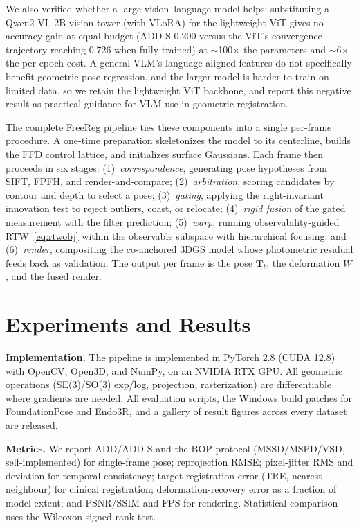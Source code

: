 \documentclass[9pt,twoside,web]{ieeecolor2}
\begin{document}
We also verified whether a large vision--language model helps: substituting a Qwen2-VL-2B vision tower (with VLoRA) for the lightweight ViT gives no accuracy gain at equal budget (ADD-S 0.200 versus the ViT's convergence trajectory reaching 0.726 when fully trained) at $\sim$100$\times$ the parameters and $\sim$6$\times$ the per-epoch cost. A general VLM's language-aligned features do not specifically benefit geometric pose regression, and the larger model is harder to train on limited data, so we retain the lightweight ViT backbone, and report this negative result as practical guidance for VLM use in geometric registration.

The complete FreeReg pipeline ties these components into a single per-frame procedure. A one-time preparation skeletonizes the model to its centerline, builds the FFD control lattice, and initializes surface Gaussians. Each frame then proceeds in six stages: (1)~\emph{correspondence}, generating pose hypotheses from SIFT, FPFH, and render-and-compare; (2)~\emph{arbitration}, scoring candidates by contour and depth to select a pose; (3)~\emph{gating}, applying the right-invariant innovation test to reject outliers, coast, or relocate; (4)~\emph{rigid fusion} of the gated measurement with the filter prediction; (5)~\emph{warp}, running observability-guided RTW~\eqref{eq:rtwobj} within the observable subspace with hierarchical focusing; and (6)~\emph{render}, compositing the co-anchored 3DGS model whose photometric residual feeds back as validation. The output per frame is the pose $\mathbf{T}_{t}$, the deformation $W$, and the fused render.

\section{Experiments and Results}\label{sec:exp}


\textbf{Implementation.} The pipeline is implemented in PyTorch 2.8 (CUDA 12.8) with OpenCV, Open3D, and NumPy, on an NVIDIA RTX GPU. All geometric operations (SE(3)/SO(3) exp/log, projection, rasterization) are differentiable where gradients are needed. All evaluation scripts, the Windows build patches for FoundationPose and Endo3R, and a gallery of result figures across every dataset are released.

\textbf{Metrics.} We report ADD/ADD-S and the BOP protocol (MSSD/MSPD/VSD, self-implemented) for single-frame pose; reprojection RMSE; pixel-jitter RMS and deviation for temporal consistency; target registration error (TRE, nearest-neighbour) for clinical registration; deformation-recovery error as a fraction of model extent; and PSNR/SSIM and FPS for rendering. Statistical comparison uses the Wilcoxon signed-rank test.
\end{document}
